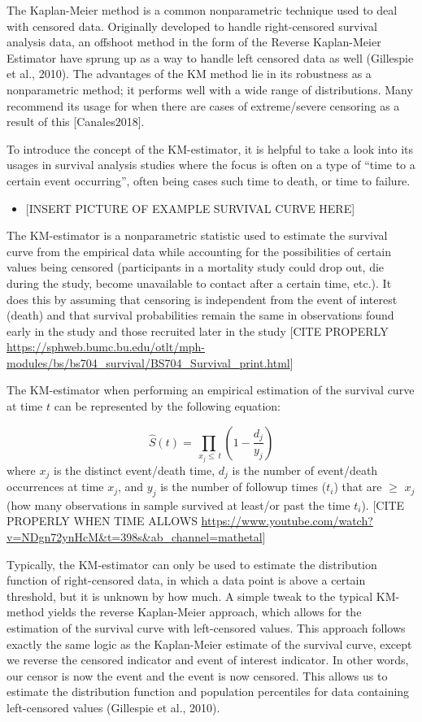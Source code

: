 \documentclass[12pt, twoside]{amherstthesis}
\providecommand{\tightlist}{%
  \setlength{\itemsep}{0pt}\setlength{\parskip}{0pt}}
\begin{document}
The Kaplan-Meier method is a common nonparametric technique used to deal with censored data. Originally developed to handle right-censored survival analysis data, an offshoot method in the form of the Reverse Kaplan-Meier Estimator have sprung up as a way to handle left censored data as well (Gillespie et al., 2010). The advantages of the KM method lie in its robustness as a nonparametric method; it performs well with a wide range of distributions. Many recommend its usage for when there are cases of extreme/severe censoring as a result of this {[}Canales2018{]}.

To introduce the concept of the KM-estimator, it is helpful to take a look into its usages in survival analysis studies where the focus is often on a type of ``time to a certain event occurring'', often being cases such time to death, or time to failure.
\begin{itemize}
\tightlist
\item
  {[}INSERT PICTURE OF EXAMPLE SURVIVAL CURVE HERE{]}
\end{itemize}
The KM-estimator is a nonparametric statistic used to estimate the survival curve from the empirical data while accounting for the possibilities of certain values being censored (participants in a mortality study could drop out, die during the study, become unavailable to contact after a certain time, etc.). It does this by assuming that censoring is independent from the event of interest (death) and that survival probabilities remain the same in observations found early in the study and those recruited later in the study {[}CITE PROPERLY \url{https://sphweb.bumc.bu.edu/otlt/mph-modules/bs/bs704_survival/BS704_Survival_print.html}{]}

The KM-estimator when performing an empirical estimation of the survival curve at time \(t\) can be represented by the following equation:

\[\hat{S}(t) = \prod_{\ x_j \le \ t }(1-\frac{d_j}{y_j})\]
where \(x_j\) is the distinct event/death time, \(d_j\) is the number of event/death occurrences at time \(x_j\), and \(y_j\) is the number of followup times (\(t_i\)) that are \(\ge\) \(x_j\) (how many observations in sample survived at least/or past the time \(t_i\)). {[}CITE PROPERLY WHEN TIME ALLOWS \url{https://www.youtube.com/watch?v=NDgn72ynHcM\&t=398s\&ab_channel=mathetal}{]}

Typically, the KM-estimator can only be used to estimate the distribution function of right-censored data, in which a data point is above a certain threshold, but it is unknown by how much. A simple tweak to the typical KM-method yields the reverse Kaplan-Meier approach, which allows for the estimation of the survival curve with left-censored values. This approach follows exactly the same logic as the Kaplan-Meier estimate of the survival curve, except we reverse the censored indicator and event of interest indicator. In other words, our censor is now the event and the event is now censored. This allows us to estimate the distribution function and population percentiles for data containing left-censored values (Gillespie et al., 2010).
\end{document}
